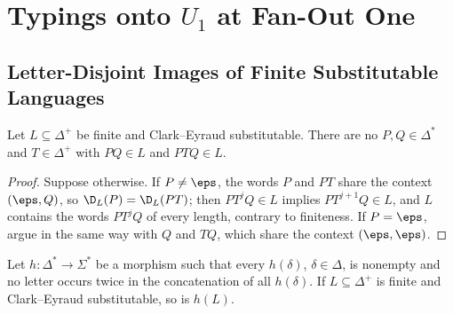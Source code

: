 \section{Typings onto \texorpdfstring{$U_1$}{U1} at Fan-Out One}
\label{app:u1-typings}

\subsection{Letter-Disjoint Images of Finite Substitutable Languages}

\begin{lemma}\label{lem:app-u1-insertion}
Let $L\subseteq\Delta^+$ be finite and Clark--Eyraud substitutable.  There are no
$P,Q\in\Delta^*$ and $T\in\Delta^+$ with $PQ\in L$ and $PTQ\in L$.
\end{lemma}

\begin{proof}
Suppose otherwise.  If $P\ne\eps$, the words $P$ and $PT$ share the context
$(\eps,Q)$, so $\D_L(P)=\D_L(PT)$; then $PT^jQ\in L$ implies $PT^{j+1}Q\in L$, and
$L$ contains the words $PT^jQ$ of every length, contrary to finiteness.  If
$P=\eps$, argue in the same way with $Q$ and $TQ$, which share the context
$(\eps,\eps)$.
\end{proof}

\begin{lemma}\label{lem:app-u1-code}
Let $h:\Delta^*\to\Sigma^*$ be a morphism such that every $h(\delta)$,
$\delta\in\Delta$, is nonempty and no letter occurs twice in the concatenation of
all $h(\delta)$.  If $L\subseteq\Delta^+$ is finite and Clark--Eyraud
substitutable, so is $h(L)$.
\end{lemma}

